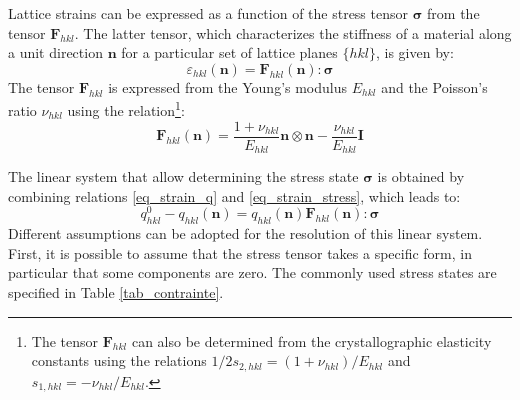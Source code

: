\documentclass[french,a4paper]{report}
\begin{document}
Lattice strains can be expressed as a function of the stress tensor $\boldsymbol \sigma$ from the tensor $\boldsymbol F_{hkl}$. The latter tensor, which characterizes the stiffness of a material along a unit direction $\boldsymbol n$ for a particular set of lattice planes $\{hkl\}$, is given by:
\begin{equation}
\varepsilon_{hkl} (\boldsymbol n) = \boldsymbol F_{hkl} (\boldsymbol n) : \boldsymbol \sigma
\label{eq_strain_stress}
\end{equation}
The tensor $\boldsymbol F_{hkl}$ is expressed from the Young's modulus $E_{hkl}$ and the Poisson's ratio $\nu_{hkl}$ using the relation\footnote{The tensor $\boldsymbol F_{hkl}$ can also be determined from the crystallographic elasticity constants using the relations $1/2 s_{2,hkl}= (1+\nu_{hkl})/E_{hkl}$ and $ s_{1,hkl} = -\nu_{hkl}/E_{hkl}$.}:
\begin{equation}
\boldsymbol F_{hkl} (\boldsymbol n) = \frac{1+\nu_{hkl}}{E_{hkl}} \boldsymbol n \otimes \boldsymbol n - \frac{\nu_{hkl}}{E_{hkl}} \boldsymbol I 
\end{equation}

The linear system that allow determining the stress state $\boldsymbol \sigma$ is obtained by combining relations \eqref{eq_strain_q} and \eqref{eq_strain_stress}, which leads to:
\begin{equation}
q^0_{hkl}-q_{hkl}(\boldsymbol n) =q_{hkl}(\boldsymbol n) \boldsymbol F_{hkl} (\boldsymbol n) : \boldsymbol \sigma
\end{equation}
Different assumptions can be adopted for the resolution of this linear system. First, it is possible to assume that the stress tensor takes a specific form, in particular that some components are zero. The commonly used stress states are specified in Table \ref{tab_contrainte}.
\end{document}
